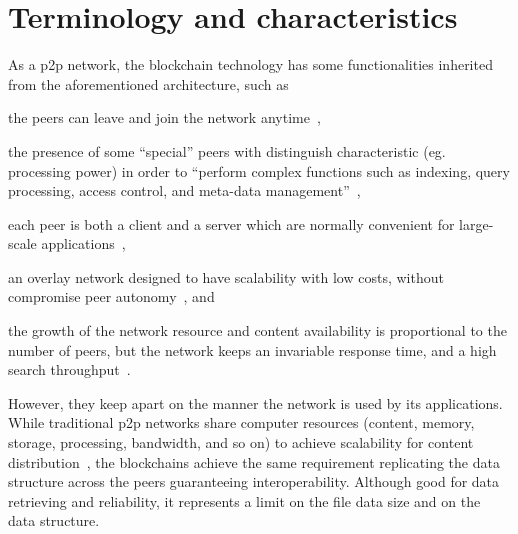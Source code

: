 \section{Terminology and characteristics}
\label{sec:terms}


As a \gls{p2p} network, the blockchain technology has some functionalities inherited from the aforementioned architecture, such as
\begin{enumerate*}[label={(\roman*)}]
    \item the peers can leave and join the network anytime~\cite{satoshi2009,book:p2p-mob},
    \item the presence of some ``special'' peers with distinguish characteristic (eg. processing power) in order to ``perform complex functions such as indexing, query processing, access control, and meta-data management''~\cite{book:p2p-mob},
    \item each peer is both a client and a server which are normally convenient for large-scale applications~\cite{book:p2p-mob},
    \item an overlay network
    designed to have scalability with low costs, without compromise peer autonomy~\cite{book:p2p-mob}, and
    \item the growth of the network resource and content availability is proportional to the number of peers, but the network keeps an invariable response time, and a high search throughput~\cite{book:p2p-mob}.
\end{enumerate*}

However, they keep apart on the manner the network is used by its applications.
While traditional \gls{p2p} networks share computer resources (content, memory, storage, processing, bandwidth, and so on) to achieve scalability for content distribution~\cite{book:p2p-mob}, %
the blockchains achieve the same requirement replicating the data structure across the peers guaranteeing interoperability.
Although good for data retrieving and reliability, it represents a limit on the file data size and on the data structure.%

